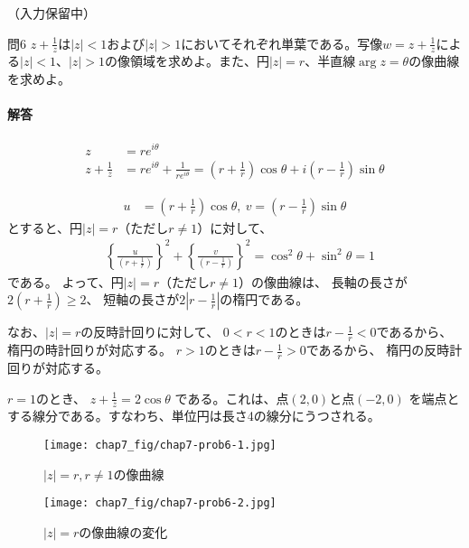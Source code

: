 （入力保留中）


\newpage
\begin{mysimplebox}{問6}
    $z+\frac{1}{z}$は$|z|<1$および$|z|>1$においてそれぞれ単葉である。写像$w=z+\frac{1}{z}$による$|z|<1$、$|z|>1$の像領域を求めよ。また、円$|z|=r$、半直線$\arg z=\theta$の像曲線を求めよ。
\end{mysimplebox}
\paragraph{解答}
\begin{align*}
    z&=re^{i\theta}\\
    z+\frac{1}{z}&=re^{i\theta}+\frac{1}{re^{i\theta}}
    =\left(r+\frac{1}{r}\right)\cos\theta+i\left(r-\frac{1}{r}\right)\sin\theta
\end{align*}

\begin{align*}
    u&=\left(r+\frac{1}{r}\right)\cos\theta,\ v=\left(r-\frac{1}{r}\right)\sin\theta
\end{align*}
とすると、円$|z|=r$（ただし$r\neq1$）に対して、
\begin{align*}
    &\left\{\frac{u}{\left(r+\frac{1}{r}\right)}\right\}^2
    +\left\{\frac{v}{\left(r-\frac{1}{r}\right)}\right\}^2
    =\cos^2\theta+\sin^2\theta=1
\end{align*}
である。
よって、円$|z|=r$（ただし$r\neq1$）の像曲線は、
長軸の長さが$2\left(r+\frac{1}{r}\right)\ge2$、
短軸の長さが$2\left|r-\frac{1}{r}\right|$の楕円である。

なお、$|z|=r$の反時計回りに対して、
$0<r<1$のときは$r-\frac{1}{r}<0$であるから、
楕円の時計回りが対応する。
$r>1$のときは$r-\frac{1}{r}>0$であるから、
楕円の反時計回りが対応する。

$r=1$のとき、
$z+\frac{1}{z}=2\cos\theta$
である。これは、点$(2,0)$と点$(-2,0)$
を端点とする線分である。すなわち、単位円は長さ4の線分にうつされる。
\begin{figure}[h]
    \centering
    \begin{minipage}{0.4\columnwidth}
        \centering
        \texttt{[image: chap7\_fig/chap7-prob6-1.jpg]}
        \caption{$|z|=r,r\neq1$の像曲線}
        \label{fig:elliptic1}
    \end{minipage}
    \begin{minipage}{0.4\columnwidth}
        \centering
        \texttt{[image: chap7\_fig/chap7-prob6-2.jpg]}
        \caption{$|z|=r$の像曲線の変化}
        \label{fig:elliptic2}
    \end{minipage}
\end{figure}


